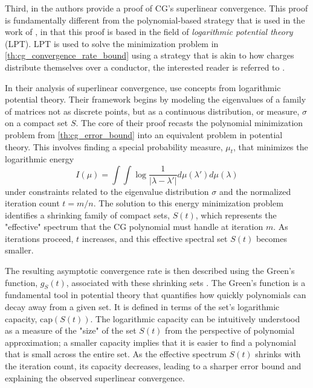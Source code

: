 Third, in \cite{cg_superlinear_Beckermann2001} the authors provide a proof of CG's superlinear convergence. This proof is fundamentally different from the polynomial-based strategy that is used in the work of \cite{cg_sharpened_convrate_Axelsson1976}, in that this proof is based in the field of \textit{logarithmic potential theory} (LPT). LPT is used to solve the minimization problem in \cref{th:cg_convergence_rate_bound} using a strategy that is akin to how charges distribute themselves over a conductor, the interested reader is referred to \cite{from_potential_theory_to_matrix_iterations_in_six_steps_Driscoll1998}.

In their analysis of superlinear convergence, \citeauthor{cg_superlinear_Beckermann2001} use concepts from logarithmic potential theory. Their framework begins by modeling the eigenvalues of a family of matrices not as discrete points, but as a continuous distribution, or measure, $\sigma$ on a compact set $S$. The core of their proof recasts the polynomial minimization problem from \cref{th:cg_error_bound} into an equivalent problem in potential theory. This involves finding a special probability measure, $\mu_t$, that minimizes the logarithmic energy
\[
    I(\mu) = \int \int \log \frac{1}{|\lambda-\lambda'|} d\mu(\lambda') d\mu(\lambda)
\]
under constraints related to the eigenvalue distribution $\sigma$ and the normalized iteration count $t = m/n$. The solution to this energy minimization problem identifies a shrinking family of compact sets, $S(t)$, which represents the "effective" spectrum that the CG polynomial must handle at iteration $m$. As iterations proceed, $t$ increases, and this effective spectral set $S(t)$ becomes smaller.

The resulting asymptotic convergence rate is then described using the Green's function, $g_S(t)$, associated with these shrinking sets \cite[Equations 2.22-2.31]{cg_superlinear_Beckermann2001}. The Green's function is a fundamental tool in potential theory that quantifies how quickly polynomials can decay away from a given set. It is defined in terms of the set's logarithmic capacity, $\text{cap}(S(t))$. The logarithmic capacity can be intuitively understood as a measure of the "size" of the set $S(t)$ from the perspective of polynomial approximation; a smaller capacity implies that it is easier to find a polynomial that is small across the entire set. As the effective spectrum $S(t)$ shrinks with the iteration count, its capacity decreases, leading to a sharper error bound and explaining the observed superlinear convergence.

